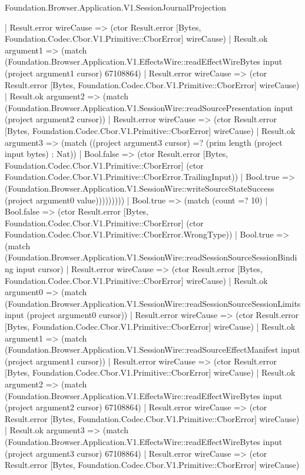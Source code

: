 \begin{lexlean}{Foundation.Browser.Application.V1.SessionJournalProjection}
\begin{semanticmodule}
{            | Result.error wireCause => (ctor Result.error [Bytes, Foundation.Codec.Cbor.V1.Primitive::CborError] wireCause)
            | Result.ok argument1 => (match (Foundation.Browser.Application.V1.EffectsWire::readEffectWireBytes input (project argument1 cursor) 67108864)
              | Result.error wireCause => (ctor Result.error [Bytes, Foundation.Codec.Cbor.V1.Primitive::CborError] wireCause)
              | Result.ok argument2 => (match (Foundation.Browser.Application.V1.SessionWire::readSourcePresentation input (project argument2 cursor))
                | Result.error wireCause => (ctor Result.error [Bytes, Foundation.Codec.Cbor.V1.Primitive::CborError] wireCause)
                | Result.ok argument3 => (match ((project argument3 cursor) =? (prim length (project input bytes) : Nat))
                  | Bool.false => (ctor Result.error [Bytes, Foundation.Codec.Cbor.V1.Primitive::CborError] (ctor Foundation.Codec.Cbor.V1.Primitive::CborError.TrailingInput))
                  | Bool.true => (Foundation.Browser.Application.V1.SessionWire::writeSourceStateSuccess (project argument0 value)))))))))
    | Bool.true => (match (count =? 10)
      | Bool.false => (ctor Result.error [Bytes, Foundation.Codec.Cbor.V1.Primitive::CborError] (ctor Foundation.Codec.Cbor.V1.Primitive::CborError.WrongType))
      | Bool.true => (match (Foundation.Browser.Application.V1.SessionWire::readSessionSourceSessionBinding input cursor)
        | Result.error wireCause => (ctor Result.error [Bytes, Foundation.Codec.Cbor.V1.Primitive::CborError] wireCause)
        | Result.ok argument0 => (match (Foundation.Browser.Application.V1.SessionWire::readSessionSourceSessionLimits input (project argument0 cursor))
          | Result.error wireCause => (ctor Result.error [Bytes, Foundation.Codec.Cbor.V1.Primitive::CborError] wireCause)
          | Result.ok argument1 => (match (Foundation.Browser.Application.V1.SessionWire::readSourceEffectManifest input (project argument1 cursor))
            | Result.error wireCause => (ctor Result.error [Bytes, Foundation.Codec.Cbor.V1.Primitive::CborError] wireCause)
            | Result.ok argument2 => (match (Foundation.Browser.Application.V1.EffectsWire::readEffectWireBytes input (project argument2 cursor) 67108864)
              | Result.error wireCause => (ctor Result.error [Bytes, Foundation.Codec.Cbor.V1.Primitive::CborError] wireCause)
              | Result.ok argument3 => (match (Foundation.Browser.Application.V1.EffectsWire::readEffectWireBytes input (project argument3 cursor) 67108864)
                | Result.error wireCause => (ctor Result.error [Bytes, Foundation.Codec.Cbor.V1.Primitive::CborError] wireCause)
}
\end{semanticmodule}
\end{lexlean}
